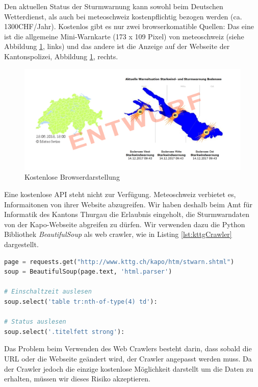 Den aktuellen Status der Sturmwarnung kann sowohl beim Deutschen Wetterdienst, als auch bei meteoschweiz kostenpflichtig bezogen werden (ca. 1300CHF/Jahr). Kostenlos gibt es nur zwei browserkomatible Quellen: Das eine ist die allgemeine Mini-Warnkarte (173 x 109 Pixel) von meteoschweiz (siehe Abbildung \ref{img:sturm}, links) und das andere ist die Anzeige auf der Webseite der Kantonspolizei, Abbildung \ref{img:sturm}, rechts.

\begin{figure}[h!]
	\centering
	\includegraphics[width=1\linewidth]{img/sturm}
	\caption{Kostenlose Browserdarstellung}
	\label{img:sturm}
\end{figure}

Eine kostenlose API steht nicht zur Verfügung. Meteoschweiz verbietet es, Informaitonen von ihrer Website abzugreifen. Wir haben deshalb beim Amt für Informatik des Kantons Thurgau die Erlaubnis eingeholt, die Sturmwarndaten von der Kapo-Webseite abgreifen zu dürfen. Wir verwenden dazu die Python Bibliothek \textit{BeautifulSoup} als web crawler, wie in Listing \ref{lst:kttgCrawler} dargestellt. \newline

\begin{lstlisting}[label=lst:kttgCrawler,caption=Web Crawler für die Sturmwarndaten, language=Python]
page = requests.get("http://www.kttg.ch/kapo/htm/stwarn.shtml")
soup = BeautifulSoup(page.text, 'html.parser')

# Einschaltzeit auslesen
soup.select('table tr:nth-of-type(4) td'):

# Status auslesen
soup.select('.titelfett strong'):
\end{lstlisting}

Das Problem beim Verwenden des Web Crawlers besteht darin, dass sobald die URL oder die Webseite geändert wird, der Crawler angepasst werden muss. Da der Crawler jedoch die einzige kostenlose Möglichkeit darstellt um die Daten zu erhalten, müssen wir dieses Risiko akzeptieren.


